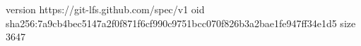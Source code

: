 version https://git-lfs.github.com/spec/v1
oid sha256:7a9cb4bec5147a2f0f871f6cf990c9751bcc070f826b3a2bae1fe947ff34e1d5
size 3647
